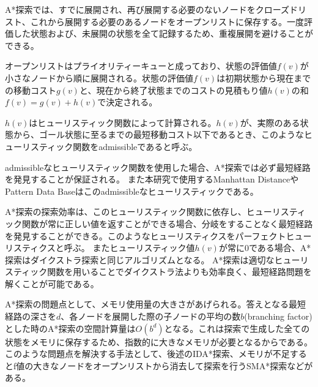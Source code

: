 \documentclass[a4paper,11pt,oneside,openany]{jsbook}
\begin{document}
A*探索では、すでに展開され、再び展開する必要のないノードをクローズドリスト、これから展開する必要のあるノードをオープンリストに保存する。一度評価した状態および、未展開の状態を全て記録するため、重複展開を避けることができる。

オープンリストはプライオリティーキューと成っており、状態の評価値$f(v)$が小さなノードから順に展開される。状態の評価値$f(v)$は初期状態から現在までの移動コスト$g(v)$と、現在から終了状態までのコストの見積もり値$h(v)$の和$f(v) = g(v) + h(v)$で決定される。

$h(v)$はヒューリスティック関数によって計算される。$h(v)$が、実際のある状態から、ゴール状態に至るまでの最短移動コスト以下であるとき、このようなヒューリスティック関数をadmissibleであると呼ぶ。

admissibleなヒューリスティック関数を使用した場合、A*探索では必ず最短経路を発見することが保証される。
また本研究で使用するManhattan DistanceやPattern Data Baseはこのadmissibleなヒューリスティックである。

A*探索の探索効率は、このヒューリスティック関数に依存し、ヒューリスティック関数が常に正しい値を返すことができる場合、分岐をすることなく最短経路を発見することができる。このようなヒューリスティクスをパーフェクトヒューリスティクスと呼ぶ。
またヒューリスティック値$h(v)$が常に0である場合、A*探索はダイクストラ探索と同じアルゴリズムとなる。
A*探索は適切なヒューリスティック関数を用いることでダイクストラ法よりも効率良く、最短経路問題を解くことが可能である。

A*探索の問題点として、メモリ使用量の大きさがあげられる。答えとなる最短経路の深さを$d$、各ノードを展開した際の子ノードの平均の数$b$(branching factor)とした時のA*探索の空間計算量は$O(b^d)$となる。これは探索で生成した全ての状態をメモリに保存するため、指数的に大きなメモリが必要となるからである。
このような問題点を解決する手法として、後述のIDA*探索\cite{Kor85}、メモリが不足するとf値の大きなノードをオープンリストから消去して探索を行うSMA*探索\cite{Rus92}などがある。
\end{document}
